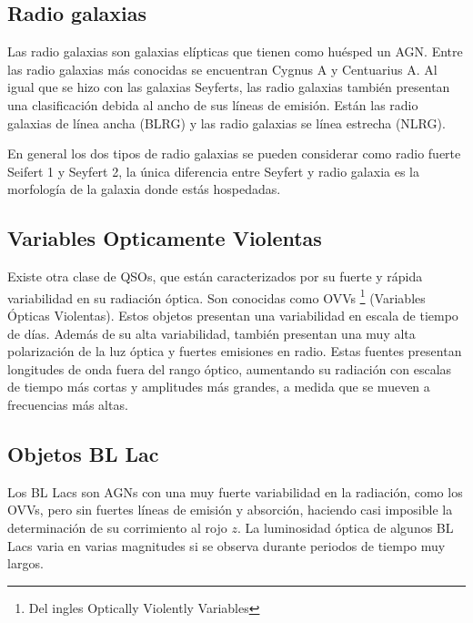 	\subsection{Radio galaxias}
	\label{subsec:Radio_Galaxy}

Las radio galaxias son galaxias elípticas que tienen como huésped un AGN. Entre las radio galaxias más conocidas se encuentran Cygnus A y Centuarius A. Al igual que se hizo con las galaxias Seyferts, las radio galaxias también presentan una clasificación debida al ancho de sus  líneas de emisión. Están las radio galaxias de línea ancha (BLRG) y las radio galaxias se línea estrecha (NLRG).

En general los dos tipos de radio galaxias se pueden considerar como radio fuerte Seifert 1 y Seyfert 2, la única diferencia entre Seyfert y radio galaxia es la morfología de la galaxia donde estás hospedadas. 

	\subsection{Variables Opticamente Violentas}
	\label{subsec:Optically_Violently_Variables}

Existe otra clase de QSOs, que están caracterizados por su fuerte y rápida variabilidad en su radiación óptica. Son conocidas como OVVs \footnote{Del ingles Optically Violently Variables } (Variables Ópticas Violentas). Estos objetos presentan una variabilidad en escala de tiempo de días. Además de su alta variabilidad, también presentan una muy alta polarización de la luz óptica y fuertes emisiones en radio. Estas fuentes presentan longitudes de onda fuera del rango óptico, aumentando su radiación con escalas de tiempo más cortas y amplitudes más grandes, a medida que se mueven a frecuencias más altas.  

	\subsection{Objetos BL Lac}
	\label{subsec:BL_Lac}

Los BL Lacs son AGNs con una muy fuerte variabilidad en la radiación, como los OVVs, pero sin fuertes líneas de emisión y absorción, haciendo casi imposible la determinación de su corrimiento al rojo $z$. La luminosidad óptica de algunos BL Lacs varia en varias magnitudes si se observa durante periodos de tiempo muy largos.


